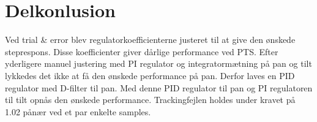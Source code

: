 \section{Delkonlusion}
Ved trial \& error blev regulatorkoefficienterne justeret til at give den ønskede 
steprespons. Disse koefficienter giver dårlige performance ved PTS. 
Efter yderligere manuel justering med PI regulator og integratormætning på pan og tilt lykkedes 
det ikke at få den ønskede performance på pan. 
Derfor laves en PID regulator med D-filter til pan. Med denne PID regulator til pan og 
PI regulatoren til tilt opnås den ønskede performance. 
Trackingfejlen holdes under kravet på 1.02 \degree{} pånær ved et par enkelte 
samples.
